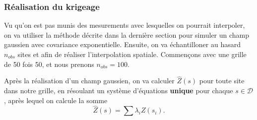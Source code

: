 \documentclass[10pt]{article} %
\begin{document}
\subsubsection{Réalisation du krigeage}

Vu qu'on est pas munis des mesurements avec lesquelles on pourrait interpoler, on va utiliser la méthode décrite dans la dernière section pour simuler un champ gaussien
avec covariance exponentielle. Ensuite, on va échantilloner au hasard $n_{obs}$ sites et afin de réaliser l'interpolation spatiale. Commen\c cons avec une grille de 50 fois 50,
et nous prenons $n_{obs} = 100$.

Après la réalisation d'un champ gaussien, on va calculer $\hat Z(s)$ pour toute site dans notre grille, en résoulant un système d'équations \textbf{unique} pour chaque $s \in \mathcal{D}$, après
lequel on calcule la somme $$ \hat Z(s) =  \sum \lambda_i Z(s_i).$$
\newpage
\end{document}
